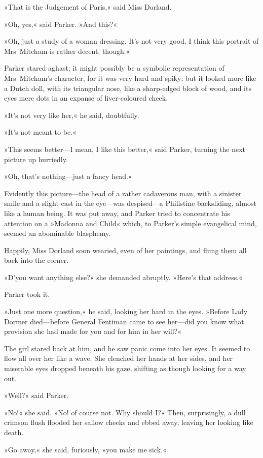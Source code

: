 »That is the Judgement of Paris,« said Miss Dorland.

»Oh, yes,« said Parker. »And this?«

»Oh, just a study of a woman dressing. It's not very good. I think this portrait of Mrs~Mitcham is rather decent, though.«

Parker stared aghast; it might possibly be a symbolic representation of Mrs~Mitcham's character, for it was very hard and spiky; but it looked more like a Dutch doll, with its triangular nose, like a sharp-edged block of wood, and its eyes mere dots in an expanse of liver-coloured cheek.

»It's not very like her,« he said, doubtfully.

»It's not meant to be.«

»This seems better—I mean, I like this better,« said Parker, turning the next picture up hurriedly.

»Oh, that's nothing—just a fancy head.«

Evidently this picture—the head of a rather cadaverous man, with a sinister smile and a slight cast in the eye—was despised—a Philistine backsliding, almost like a human being. It was put away, and Parker tried to concentrate his attention on a »Madonna and Child« which, to Parker's simple evangelical mind, seemed an abominable blasphemy.

Happily, Miss Dorland soon wearied, even of her paintings, and flung them all back into the corner.

»D'you want anything else?« she demanded abruptly. »Here's that address.«

Parker took it.

»Just one more question,« he said, looking her hard in the eyes. »Before Lady Dormer died—before General Fentiman came to see her—did you know what provision she had made for you and for him in her will?«

The girl stared back at him, and he saw panic come into her eyes. It seemed to flow all over her like a wave. She clenched her hands at her sides, and her miserable eyes dropped beneath his gaze, shifting as though looking for a way out.

»Well?« said Parker.

»No!« she said. »No! of course not. Why should I\@?« Then, surprisingly, a dull crimson flush flooded her sallow cheeks and ebbed away, leaving her looking like death.

»Go away,« she said, furiously, »you make me sick.«